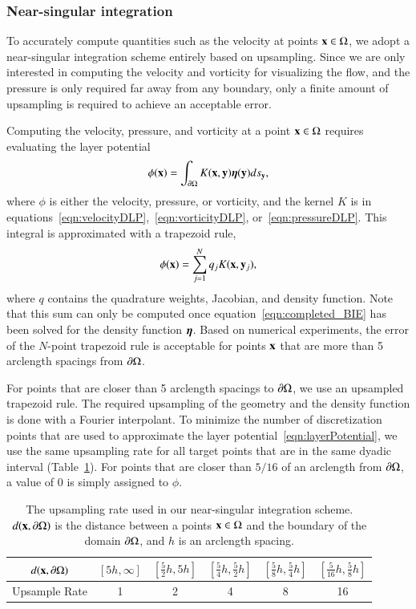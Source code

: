 \documentclass[preprint, 10pt]{elsarticle}
\begin{document}
\subsubsection{Near-singular integration}
To accurately compute quantities such as the velocity at points ${\mathbf{x}} \in
\Omega$, we adopt a near-singular integration scheme entirely based on
upsampling.  Since we are only interested in computing the velocity and
vorticity for visualizing the flow, and the pressure is only required
far away from any boundary, only a finite amount of upsampling is
required to achieve an acceptable error.

Computing the velocity, pressure, and vorticity at a point ${\mathbf{x}} \in
\Omega$ requires evaluating the layer potential
\begin{align*}
  \phi({\mathbf{x}}) = \int_{{\partial}\Omega} K({\mathbf{x}},{\mathbf{y}}) {\boldsymbol\eta}({\mathbf{y}}) ds_{\mathbf{y}},
\end{align*}
where $\phi$ is either the velocity, pressure, or vorticity, and the
kernel $K$ is in
equations~\eqref{eqn:velocityDLP},~\eqref{eqn:vorticityDLP},
or~\eqref{eqn:pressureDLP}.  This integral is approximated with a
trapezoid rule, 
\begin{align}
  \phi({\mathbf{x}}) = \sum_{j=1}^N q_j K({\mathbf{x}},{\mathbf{y}}_j),
  \label{eqn:layerPotential}
\end{align}
where $q$ contains the quadrature weights, Jacobian, and density
function.  Note that this sum can only be computed once
equation~\eqref{eqn:completed_BIE} has been solved for the density
function ${\boldsymbol\eta}$.  Based on numerical experiments, the error of the
$N$-point trapezoid rule is acceptable for points ${\mathbf{x}}$ that are more
than 5 arclength spacings from ${\partial}\Omega$.

For points that are closer than 5 arclength spacings to ${\partial}\Omega$, we
use an upsampled trapezoid rule.  The required upsampling of the
geometry and the density function is done with a Fourier interpolant.
To minimize the number of discretization points that are used to
approximate the layer potential~\eqref{eqn:layerPotential}, we use the
same upsampling rate for all target points that are in the same dyadic
interval (Table~\ref{tbl:upsampling}).  For points that are closer than
$5/16$ of an arclength from ${\partial}\Omega$, a value of 0 is simply assigned
to $\phi$.
\begin{table}[htpb]
\centering
\begin{tabular}{|c|ccccc|}
  \hline
  $d({\mathbf{x}},{\partial}\Omega)$ &
  $[5h,\infty]$ &
  $[\frac{5}{2}h,5h]$ &
  $[\frac{5}{4}h,\frac{5}{2}h]$ & 
  $[\frac{5}{8}h,\frac{5}{4}h]$ &
  $[\frac{5}{16}h,\frac{5}{8}h]$ \\ [2ex]
  \hline
  Upsample Rate & 1 & 2 & 4 & 8 & 16 \\
  \hline
\end{tabular}
\caption{\label{tbl:upsampling}The upsampling rate used in our
near-singular integration scheme.  $d({\mathbf{x}},{\partial}\Omega)$ is the distance
between a points ${\mathbf{x}} \in \Omega$ and the boundary of the domain
${\partial}\Omega$, and $h$ is an arclength spacing.}
\end{table}
\end{document}
